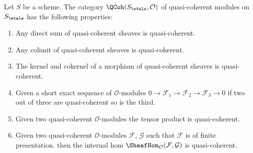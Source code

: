 \begin{lemma}
\label{lemma-properties-quasi-coherent}
Let $S$ be a scheme. The category $\QCoh(S_\etale, \mathcal{O})$
of quasi-coherent modules on $S_\etale$
has the following properties:
\begin{enumerate}
\item Any direct sum of quasi-coherent sheaves is quasi-coherent.
\item Any colimit of quasi-coherent sheaves is quasi-coherent.
\item The kernel and cokernel of a morphism of quasi-coherent sheaves
is quasi-coherent.
\item Given a short exact sequence of $\mathcal{O}$-modules
$0 \to \mathcal{F}_1 \to \mathcal{F}_2 \to \mathcal{F}_3 \to 0$
if two out of three are quasi-coherent so is the third.
\item Given two quasi-coherent $\mathcal{O}$-modules
the tensor product is quasi-coherent.
\item Given two quasi-coherent $\mathcal{O}$-modules
$\mathcal{F}$, $\mathcal{G}$ such that $\mathcal{F}$
is of finite presentation.
then the internal hom
$\SheafHom_\mathcal{O}(\mathcal{F}, \mathcal{G})$
is quasi-coherent.
\end{enumerate}
\end{lemma}

